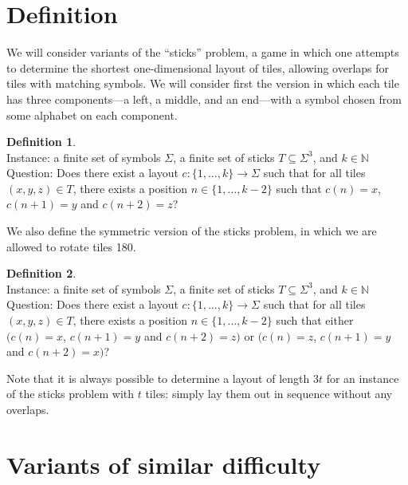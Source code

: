 \documentclass[draft]{article}
\author{Jeffrey Finkelstein}
\date{\today}
\theoremstyle{definition} \newtheorem{definition}[definition]{Definition}
\newcommand{\dash}{\mbox{-}}
\newcommand{\asticks}{ASYM\dash STICKS}
\newcommand{\sticks}{SYM\dash STICKS}
\newenvironment{langdef}[1]{\begin{definition}{\lang{#1}}}{\end{definition}}
\newenvironment{instance}{\\Instance:}{}
\newenvironment{question}{\\Question:}{}
\begin{document}
  \section{Definition}

  We will consider variants of the ``sticks'' problem, a game in which one
  attempts to determine the shortest one-dimensional layout of tiles, allowing
  overlaps for tiles with matching symbols. We will consider first the version
  in which each tile has three components---a left, a middle, and an end---with
  a symbol chosen from some alphabet on each component.

  \begin{langdef}{\asticks}\label{def:asym-sticks}
    \begin{instance}
      a finite set of symbols $\Sigma$, a finite set of sticks
      $T\subseteq\Sigma^3$, and $k\in\mathbb{N}$
    \end{instance}
    \begin{question}
      Does there exist a layout $c\colon\{1,\ldots,k\}\to\Sigma$ such that for
        all tiles $(x, y, z)\in T$, there exists a position
        $n\in\{1,\ldots,k-2\}$ such that $c(n)=x$, $c(n+1)=y$ and
        $c(n+2)=z$?
    \end{question}
  \end{langdef}

  We also define the symmetric version of the sticks problem, in which we are
  allowed to rotate tiles 180\degree.

  \begin{langdef}{\sticks}\label{def:sym-sticks}
    \begin{instance}
      a finite set of symbols $\Sigma$, a finite set of sticks
      $T\subseteq\Sigma^3$, and $k\in\mathbb{N}$
    \end{instance}
    \begin{question}
      Does there exist a layout $c\colon\{1,\ldots,k\}\to\Sigma$ such that for
        all tiles $(x, y, z)\in T$, there exists a position
        $n\in\{1,\ldots,k-2\}$ such that either $(c(n)=x$, $c(n+1)=y$ and
        $c(n+2)=z)$ or $(c(n)=z$, $c(n+1)=y$ and $c(n+2)=x)$?
    \end{question}
  \end{langdef}

  Note that it is always possible to determine a layout of length $3t$ for an
  instance of the sticks problem with $t$ tiles: simply lay them out in
  sequence without any overlaps.

  \section{Variants of similar difficulty}
\end{document}

